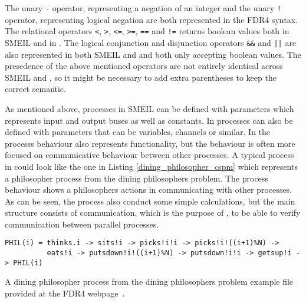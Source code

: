 The unary \texttt{-} operator, representing a negation of an integer and the unary \texttt{!} operator, representing logical negation are both represented in the FDR4 syntax. The relational operators \texttt{<}, \texttt{>}, \texttt{<=}, \texttt{>=}, \texttt{==} and \texttt{!=} returns boolean values both in SMEIL and in \cspm. The logical conjunction and disjunction operators \texttt{\&\&} and \texttt{||} are also represented in both SMEIL and \cspm and both only accepting boolean values.
The presedence of the above mentioned operators are not entirely identical across SMEIL and \cspm, so it might be necessary to add extra parentheses to keep the correct semantic.



As mentioned above, processes in SMEIL can be defined with parameters which represents input and output buses as well as constants. In \cspm{} processes can also be defined with parameters that can be variables, channels or similar.
In \cspm the processs behaviour also represents functionality, but the behaviour is often more focused on communicative behaviour between other processes. A typical process in \cspm could look like the one in Listing \ref{dining_philosopher_cspm} which represents a philosopher process from the dining philosophers problem. The process behaviour shows a philosophers actions in communicating with other processes. As can be seen, the process also conduct some simple calculations, but the main structure consists of communication, which is the purpose of \cspm, to be able to verify communication between parallel processes.
\begin{listing}
\begin{verbatim}
PHIL(i) = thinks.i -> sits!i -> picks!i!i -> picks!i!((i+1)%N) ->
          eats!i -> putsdown!i!((i+1)%N) -> putsdown!i!i -> getsup!i -> PHIL(i)

\end{verbatim}
\caption{A dining philosopher process from the dining philosophers problem example file provided at the FDR4 webpage~\cite{fdr_example}.}
\label{dining_philosopher_cspm}
\end{listing}

